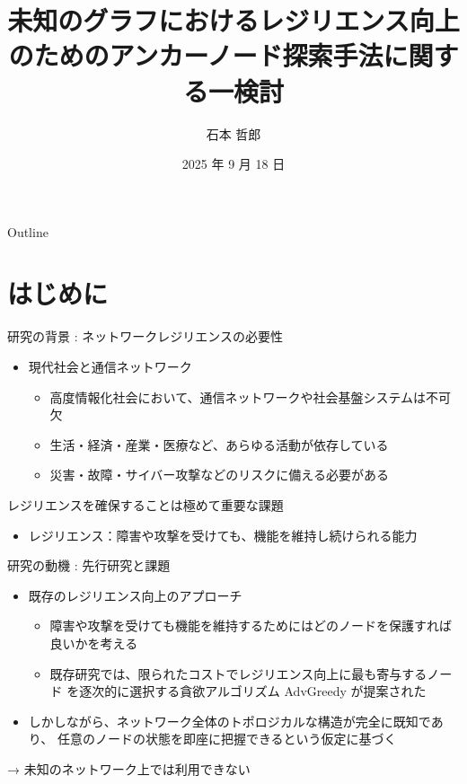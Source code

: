 \documentclass[compress,dvipdfmx,11pt]{beamer}
\title[中間審査]{\bf  未知のグラフにおけるレジリエンス向上のためのアンカーノード探索手法に関する一検討}
\author[]{石本 哲郎}
\institute{関西学院大学 工学部 情報工学課程}
\date{2025 年 9 月 18 日}
\begin{document}
\maketitle
\begin{frame}{Outline}
\tableofcontents
\end{frame}

\newcommand{\pivec}{\mathbf \pi}
\newcommand{\xvec}{\mathbf x}
\newcommand{\yvec}{\mathbf y}
\newcommand{\zvec}{\mathbf z}
\newcommand{\Emat}{\mathbf E}
\newcommand{\Imat}{\mathbf I}

\bf
\section{はじめに}
\label{sec:org8d9d03d}
\begin{frame}[label={sec:org3682d4b}]{研究の背景 : ネットワークレジリエンスの必要性}
\begin{itemize}
\item 現代社会と通信ネットワーク
\begin{itemize}
\item 高度情報化社会において、通信ネットワークや社会基盤システムは不可欠
\item 生活・経済・産業・医療など、あらゆる活動が依存している
\item 災害・故障・サイバー攻撃などのリスクに備える必要がある
\end{itemize}
\end{itemize}

\vspace{3mm}

\alert{レジリエンスを確保することは極めて重要な課題}
\begin{itemize}
\item レジリエンス：障害や攻撃を受けても、機能を維持し続けられる能力
\end{itemize}
\end{frame}
\begin{frame}[label={sec:org97a22d9}]{研究の動機 : 先行研究と課題}
\begin{itemize}
\item 既存のレジリエンス向上のアプローチ
\begin{itemize}
\item 障害や攻撃を受けても機能を維持するためにはどのノードを保護すれば良いかを考える
\item 既存研究では、限られたコストでレジリエンス向上に最も寄与するノード
を逐次的に選択する貪欲アルゴリズム AdvGreedy が提案された
\end{itemize}

\item しかしながら、ネットワーク全体のトポロジカルな構造が完全に既知であり、
任意のノードの状態を即座に把握できるという仮定に基づく
\end{itemize}

\vspace{2mm}

→ 未知のネットワーク上では利用できない
\end{frame}
\end{document}
